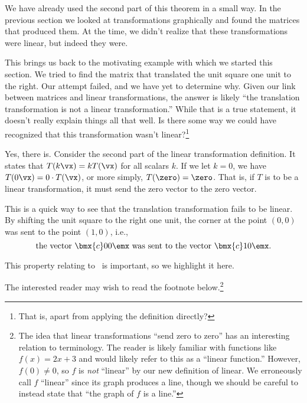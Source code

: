 We have already used the second part of this theorem in a small way. In the previous section we looked at transformations graphically and found the matrices that produced them. At the time, we didn't realize that these transformations were linear, but indeed they were.

This brings us back to the motivating example with which we started this section. We tried to find the matrix that translated the unit square one unit to the right. Our attempt failed, and we have yet to determine why. Given our link between matrices and linear transformations, the answer is likely ``the translation transformation is not a linear transformation.'' While that is a true statement, it doesn't really explain things all that well. Is there some way we could have recognized that this transformation wasn't linear?\footnote{That is, apart from applying the definition directly?}

Yes, there is. Consider the second part of the linear transformation definition. It states that $T(k\vx) = kT(\vx)$ for all scalars $k$. If we let $k=0$, we have $T(0\vx) = 0\cdot T(\vx)$, or more simply, $T(\zero) = \zero$. That is, if $T$ is to be a linear transformation, it must send the zero vector  to the zero vector.

This is a quick way to see that the translation transformation fails to be linear. By shifting the unit square to the right one unit, the corner at the point $(0,0)$ was sent to the point $(1,0)$, i.e., $$\text{the vector } \bmx{c}0\\0\emx \text{ was sent to the vector } \bmx{c}1\\0\emx.$$

This property relating to \zero\ is important, so we highlight it here.


The interested reader may wish to read the footnote below.\footnote{The idea that linear transformations ``send zero to zero'' has an interesting relation to terminology. The reader is likely familiar with functions like $f(x) = 2x+3$ and would likely refer to this as a ``linear function.'' However, $f(0) \neq 0$, so $f$ is \textit{not} ``linear'' by our new definition of linear. We erroneously call $f$ ``linear'' since its graph produces a line, though we should be careful to instead state that ``the graph of $f$ is a line.''}\\

